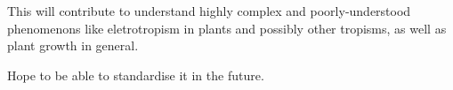 This will contribute to understand highly complex and poorly-understood phenomenons like eletrotropism in plants and possibly other tropisms, as well as plant growth in general.

%


Hope to be able to standardise it in the future.

